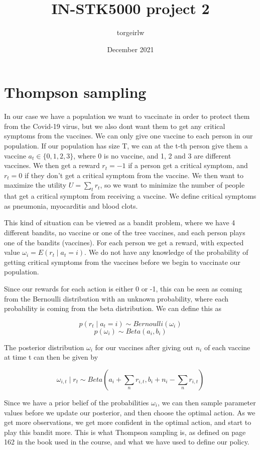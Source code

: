 \documentclass{article}
\title{IN-STK5000 project 2}
\author{torgeirlw }
\date{December 2021}
\begin{document}
\maketitle

\section{Thompson sampling}

In our case we have a population we want to vaccinate in order to protect them from the Covid-19 virus, but we also dont want them to get any critical symptoms from the vaccines. We can only give one vaccine to each person in our population. If our population has size T, we can at the t-th person give them a vaccine $a_{t} \in \{0, 1, 2, 3\}$, where 0 is no vaccine, and 1, 2 and 3 are different vaccines. We then get a reward $r_{t} = -1$ if a person get a critical symptom, and $r_{t} = 0$ if they don't get a critical symptom from the vaccine. We then want to maximize the utility $U = \sum\limits_{t} r_{t} $, so we want to minimize the number of people that get a critical symptom from receiving a vaccine. We define critical symptoms as pneumonia, myocarditis and blood clots. 

This kind of situation can be viewed as a bandit problem, where we have 4 different bandits, no vaccine or one of the tree vaccines, and each person plays one of the bandits (vaccines). For each person we get a reward, with expected value $\omega_{i} = E(r_{t} \mid a_{t} = i) $. We do not have any knowledge of the probability of getting critical symptoms from the vaccines before we begin to vaccinate our population.

Since our rewards for each action is either 0 or -1, this can be  seen as coming from the Bernoulli distribution with an unknown probability, where each probability is coming from the beta distribution. We can define this as 

    \[p(r_{t} \mid a_{t} = i) \sim Bernoulli(\omega_{i})\]
    \[p(\omega_{i}) \sim Beta(a_{i}, b_{i})\]
    
The posterior distribution $\omega_{i}$ for our vaccines after giving out $n_{i}$ of each vaccine at time t can then be given by

\[ \omega_{i,t} \mid r_{t} \sim Beta(a_{i} + \sum_{n} r_{i,t}, b_{i} + n_{i} - \sum_{n} r_{i,t})\]

Since we have a prior belief of the probabilities $\omega_{i}$, we can then sample parameter values before we update our posterior, and then choose the optimal action. As we get more observations, we get more confident in the optimal action, and start to play this bandit more. This is what Thompson sampling is, as defined on page 162 in the book used in the course, and what we have used to define our policy.
\end{document}
